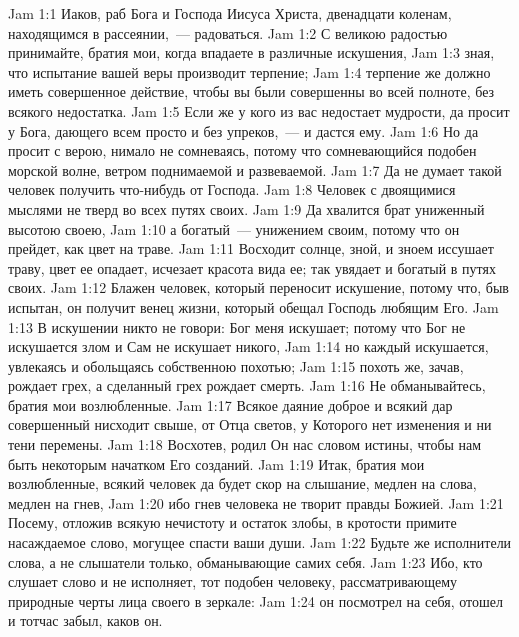 \vs Jam 1:1 Иаков, раб Бога и Господа Иисуса Христа, двенадцати коленам, находящимся в рассеянии,~--- радоваться.
\vs Jam 1:2 С великою радостью принимайте, братия мои, когда впадаете в различные искушения,
\vs Jam 1:3 зная, что испытание вашей веры производит терпение;
\vs Jam 1:4 терпение же должно иметь совершенное действие, чтобы вы были совершенны во всей полноте, без всякого недостатка.
\vs Jam 1:5 Если же у кого из вас недостает мудрости, да просит у Бога, дающего всем просто и без упреков,~--- и дастся ему.
\vs Jam 1:6 Но да просит с верою, нимало не сомневаясь, потому что сомневающийся подобен морской волне, ветром поднимаемой и развеваемой.
\vs Jam 1:7 Да не думает такой человек получить что-нибудь от Господа.
\vs Jam 1:8 Человек с двоящимися мыслями не тверд во всех путях своих.
\rsbpar\vs Jam 1:9 Да хвалится брат униженный высотою своею,
\vs Jam 1:10 а богатый~--- унижением своим, потому что он прейдет, как цвет на траве.
\vs Jam 1:11 Восходит солнце,  зной, и зноем иссушает траву, цвет ее опадает, исчезает красота вида ее; так увядает и богатый в путях своих.
\rsbpar\vs Jam 1:12 Блажен человек, который переносит искушение, потому что, быв испытан, он получит венец жизни, который обещал Господь любящим Его.
\vs Jam 1:13 В искушении никто не говори: Бог меня искушает; потому что Бог не искушается злом и Сам не искушает никого,
\vs Jam 1:14 но каждый искушается, увлекаясь и обольщаясь собственною похотью;
\vs Jam 1:15 похоть же, зачав, рождает грех, а сделанный грех рождает смерть.
\rsbpar\vs Jam 1:16 Не обманывайтесь, братия мои возлюбленные.
\vs Jam 1:17 Всякое даяние доброе и всякий дар совершенный нисходит свыше, от Отца светов, у Которого нет изменения и ни тени перемены.
\vs Jam 1:18 Восхотев, родил Он нас словом истины, чтобы нам быть некоторым начатком Его созданий.
\rsbpar\vs Jam 1:19 Итак, братия мои возлюбленные, всякий человек да будет скор на слышание, медлен на слова, медлен на гнев,
\vs Jam 1:20 ибо гнев человека не творит правды Божией.
\vs Jam 1:21 Посему, отложив всякую нечистоту и остаток злобы, в кротости примите насаждаемое слово, могущее спасти ваши души.
\vs Jam 1:22 Будьте же исполнители слова, а не слышатели только, обманывающие самих себя.
\vs Jam 1:23 Ибо, кто слушает слово и не исполняет, тот подобен человеку, рассматривающему природные черты лица своего в зеркале:
\vs Jam 1:24 он посмотрел на себя, отошел и тотчас забыл, каков он.
